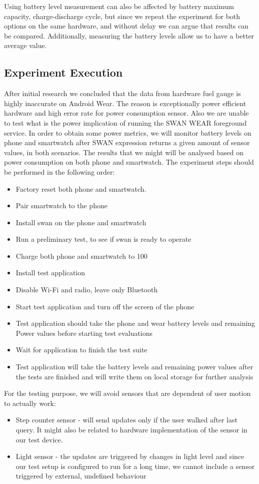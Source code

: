  Using battery level measurement can also be affected by battery maximum capacity, charge-discharge cycle, but since we repeat the experiment for both options on the same hardware, and without delay we can argue that results can be compared.
 Additionally, measuring the battery levels allow us to have a better average value.
 
 \subsection{Experiment Execution}
 After initial research we concluded that the data from hardware fuel gauge is highly inaccurate on Android Wear.
 The reason is exceptionally power efficient hardware and high error rate for power consumption sensor. 
 Also we are unable to test what is the power implication of running the SWAN WEAR foreground service. 
 In order to obtain some power metrics, we will monitor battery levels on phone and smartwatch after SWAN expression returns a given amount of sensor values, in both scenarios.
The results that we might will be analysed based on power consumption on both phone and smartwatch.
The experiment steps should be performed in the following order:
\begin{itemize}
 \item Factory reset both phone and smartwatch.
 \item Pair smartwatch to the phone
 \item Install swan on the phone and smartwatch
 \item Run a preliminary test, to see if swan is ready to operate
 \item Charge both phone and smartwatch to 100%
 \item Install test application
 \item Disable Wi-Fi and radio, leave only Bluetooth
 \item Start test application and turn off the screen of the phone
 \item Test application should take the phone and wear battery levels and remaining Power values before starting test evaluations
 \item Wait for application to finish the test suite
 \item Test application will take the battery levels and remaining power values after the tests are finished and will write them on local storage for further analysis
\end{itemize}

For the testing purpose, we will avoid sensors that are dependent of user motion to actually work: 
\begin{itemize}
 \item Step counter sensor - will send updates only if the user walked after last query. It might also be related to hardware implementation of the sensor in our test device\cite{motorolla_stepcounter}. 
 \item Light sensor - the updates are triggered by changes in light level and since our test setup is configured to run for a long time, we cannot include a sensor triggered by external,
 undefined behaviour
\end{itemize}

